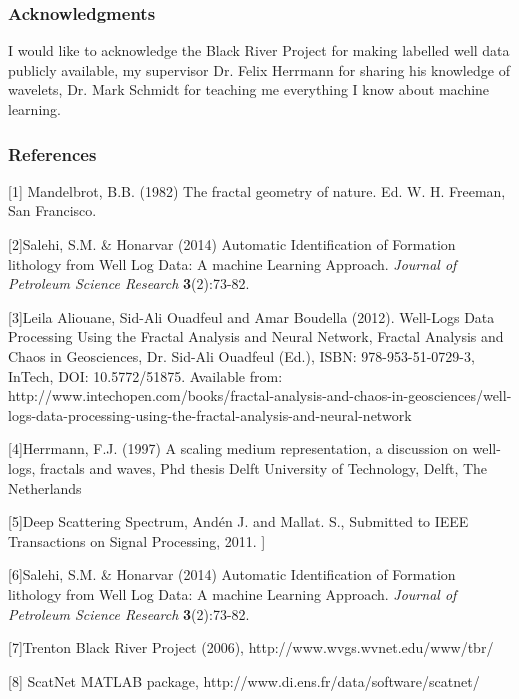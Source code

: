 \documentclass{article} %
\begin{document}
\subsubsection*{Acknowledgments}

I would like to acknowledge the Black River Project for making
labelled well data publicly available, my supervisor Dr. Felix
Herrmann for sharing his knowledge of wavelets, Dr. Mark Schmidt
for teaching me everything I know about machine learning.

\subsubsection*{References}

\small{
[1] Mandelbrot, B.B. (1982) The fractal geometry of
nature. Ed. W. H. Freeman, San Francisco.

[2]Salehi, S.M. \& Honarvar (2014) Automatic Identification of
Formation lithology from Well Log Data: A machine Learning Approach. 
{\it Journal of Petroleum Science Research}
{\bf 3}(2):73-82.

[3]Leila Aliouane, Sid-Ali Ouadfeul and Amar Boudella (2012). Well-Logs Data Processing Using the Fractal Analysis and Neural Network, Fractal Analysis and Chaos in Geosciences, Dr. Sid-Ali Ouadfeul (Ed.), ISBN: 978-953-51-0729-3, InTech, DOI: 10.5772/51875. Available from: http://www.intechopen.com/books/fractal-analysis-and-chaos-in-geosciences/well-logs-data-processing-using-the-fractal-analysis-and-neural-network

[4]Herrmann, F.J. (1997)  A scaling medium representation, a
discussion on well-logs, fractals and waves, Phd thesis Delft
University of Technology, Delft, The Netherlands

[5]Deep Scattering Spectrum, Andén J. and Mallat. S., Submitted to IEEE Transactions on Signal Processing, 2011. ]

[6]Salehi, S.M. \& Honarvar (2014) Automatic Identification of
Formation lithology from Well Log Data: A machine Learning Approach. 
{\it Journal of Petroleum Science Research}
{\bf 3}(2):73-82.

[7]Trenton Black River Project (2006),
http://www.wvgs.wvnet.edu/www/tbr/

[8] ScatNet MATLAB package,
http://www.di.ens.fr/data/software/scatnet/
}
\end{document}
